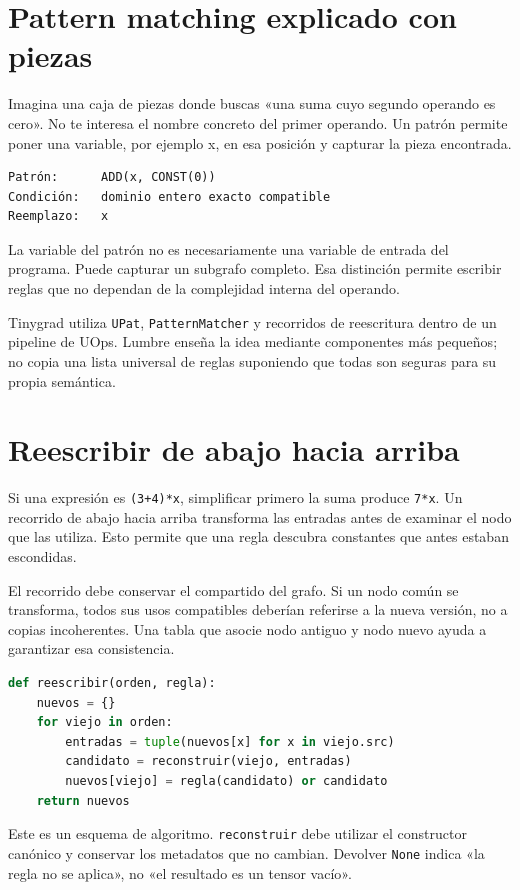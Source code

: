 \documentclass[12pt,a4paper,oneside]{report}
\begin{document}
\section{Pattern matching explicado con piezas}
Imagina una caja de piezas donde buscas «una suma cuyo segundo operando es cero». No te interesa el nombre concreto del primer operando. Un patrón permite poner una variable, por ejemplo x, en esa posición y capturar la pieza encontrada.

\begin{lstlisting}
Patrón:      ADD(x, CONST(0))
Condición:   dominio entero exacto compatible
Reemplazo:   x
\end{lstlisting}
La variable del patrón no es necesariamente una variable de entrada del programa. Puede capturar un subgrafo completo. Esa distinción permite escribir reglas que no dependan de la complejidad interna del operando.

Tinygrad utiliza \texttt{UPat}, \texttt{PatternMatcher} y recorridos de reescritura dentro de un pipeline de UOps. Lumbre enseña la idea mediante componentes más pequeños; no copia una lista universal de reglas suponiendo que todas son seguras para su propia semántica. \cite{tinygrad-codegen}

\section{Reescribir de abajo hacia arriba}
Si una expresión es \texttt{(3+4)*x}, simplificar primero la suma produce \texttt{7*x}. Un recorrido de abajo hacia arriba transforma las entradas antes de examinar el nodo que las utiliza. Esto permite que una regla descubra constantes que antes estaban escondidas.

El recorrido debe conservar el compartido del grafo. Si un nodo común se transforma, todos sus usos compatibles deberían referirse a la nueva versión, no a copias incoherentes. Una tabla que asocie nodo antiguo y nodo nuevo ayuda a garantizar esa consistencia.

\begin{lstlisting}[language=Python]
def reescribir(orden, regla):
    nuevos = {}
    for viejo in orden:
        entradas = tuple(nuevos[x] for x in viejo.src)
        candidato = reconstruir(viejo, entradas)
        nuevos[viejo] = regla(candidato) or candidato
    return nuevos
\end{lstlisting}
Este es un esquema de algoritmo. \texttt{reconstruir} debe utilizar el constructor canónico y conservar los metadatos que no cambian. Devolver \texttt{None} indica «la regla no se aplica», no «el resultado es un tensor vacío».
\end{document}
